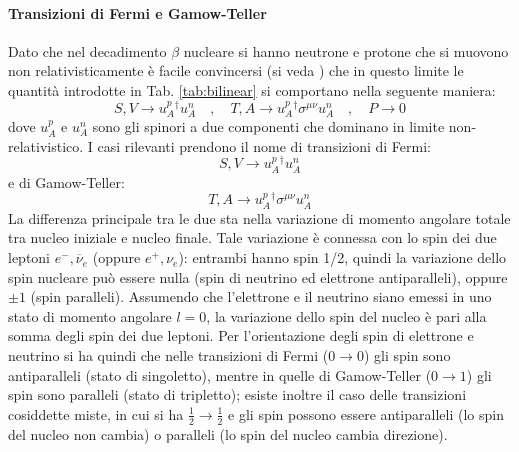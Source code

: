 \documentclass{subnucbo}
\begin{document}
\paragraph{Transizioni di Fermi e Gamow-Teller} Dato che nel decadimento $\beta$ nucleare si hanno neutrone e protone che si muovono non relativisticamente è facile convincersi (si veda \cite{ref:greiner}) che in questo limite le quantità introdotte in Tab. \ref{tab:bilinear} si comportano nella seguente maniera:
\begin{equation}
        S , V \rightarrow u_{A}^{p} ^ { \dagger } u_{A}^ { n  } \quad , \quad T , A \rightarrow u_{A} ^ { p } ^ { \dagger } \sigma^{\mu\nu} u_{A} ^ {n } \quad , \quad P \rightarrow 0
        \label{eq:sv_app}
\end{equation}
dove $u_{A}^{p}$ e $u_{A}^{n}$ sono gli spinori a due componenti che dominano in limite non-relativistico. I casi rilevanti prendono il nome di transizioni di Fermi:
\begin{equation}
        S , V \rightarrow u_{A} ^ {p } ^ { \dagger } u_{A} ^ { n  }
        \label{eq:ta_app}
\end{equation}
e di Gamow-Teller:
\begin{equation}
        T , A \rightarrow u _{A}^ { p } ^ { \dagger } \sigma^{\mu\nu} u _{A} ^{ n  }
\end{equation}
La differenza principale tra le due sta nella variazione di momento angolare totale tra nucleo iniziale e nucleo finale. Tale variazione è connessa con lo spin dei due leptoni $e ^ { - } , \overline { \nu } _ { e }$ (oppure $e^{+}, \nu_{e}$): entrambi hanno spin 1/2, quindi la variazione dello spin nucleare può essere nulla (spin di neutrino ed elettrone antiparalleli), oppure $\pm1$ (spin paralleli). Assumendo che l'elettrone e il neutrino siano emessi in uno stato di momento angolare $l=0$, la variazione dello spin del nucleo è pari alla somma degli spin dei due leptoni. Per l'orientazione degli spin di elettrone e neutrino si ha quindi che nelle transizioni di Fermi ($0 \rightarrow 0$) gli spin sono antiparalleli (stato di singoletto), mentre in quelle di Gamow-Teller ($0 \rightarrow 1$) gli spin sono paralleli (stato di tripletto); esiste inoltre il caso delle transizioni cosiddette miste, in cui si ha $\frac{1}{2} \rightarrow \frac{1}{2}$ e gli spin possono essere antiparalleli (lo spin del nucleo non cambia) o paralleli (lo spin del nucleo cambia direzione).\\
\end{document}
